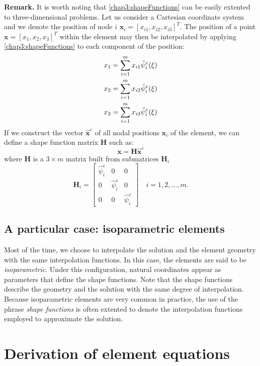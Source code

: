 \noindent \textbf{Remark.}
It is worth noting that \eqref{chap3:shapeFunctions} can be easily extented to three-dimensional problems. Let us consider a Cartesian coordinate system and we denote the position of node $ i $ $ \mathbf{x}_i = [x_{i1}, x_{i2}, x_{i3}]^T$. The position of a point $ \mathbf{x} = [x_{1}, x_{2}, x_{3}]^T$ within the element may then be interpolated by applying \eqref{chap3:shapeFunctions} to each component of the position:
\begin{align}
x_1 &= \sum_{i=1}^m x_{i1} \hat{\psi}_i^e(\xi) \notag \\
x_2 &= \sum_{i=1}^m x_{i2} \hat{\psi}_i^e(\xi) \\
x_3 &= \sum_{i=1}^m x_{i3} \hat{\psi}_i^e(\xi) \notag
\end{align}
If we construct the vector $ \hat{\mathbf{x}}^e $ of all nodal positions $ \mathbf{x}_i $ of the element, we can define a shape function matrix $ \mathbf{H} $ such as:
\begin{equation}
\label{chap3:H}
\mathbf{x} = \mathbf{H} \hat{\mathbf{x}}^e
\end{equation}
where $ \mathbf{H} $ is a $ 3 \times m $ matrix built from submatrices $ \mathbf{H}_i $
\begin{equation}
\mathbf{H}_i = 
	\begin{bmatrix}
		\hat{\psi}_i^e & 0 & 0 \\
		0 & \hat{\psi}_i^e & 0 \\
		0 & 0 & \hat{\psi}_i^e
	\end{bmatrix}
\quad i = 1, 2, \ldots, m.
\end{equation}


	\subsection{A particular case: isoparametric elements}
Most of the time, we choose to interpolate the solution and the element geometry with the same interpolation functions. In this case, the elements are said to be \emph{isoparametric}. Under this configuration, natural coordinates appear as parameters that define the shape functions. Note that the shape functions describe the geometry and the solution with the same degree of interpolation. Because isoparametric elements are very common in practice, the use of the phrase \emph{shape functions} is often extented to denote the interpolation functions employed to approximate the solution.
	
	
\section{Derivation of element equations}	\label{chap3:derivationEquations}

